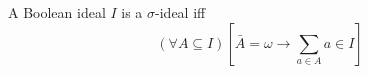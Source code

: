 A Boolean ideal $I$ is a $\sigma$-ideal iff
$$
(\forall A \subseteq I) \left[ \bar{A} = \omega \rightarrow \sum_{a \in A} a \in I \right]
$$
